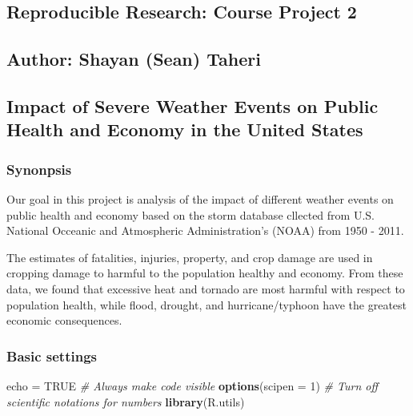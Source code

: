 \documentclass[]{article}
\title{}
\author{}
\date{}
\newenvironment{Shaded}{\begin{snugshade}}{\end{snugshade}}
\newcommand{\KeywordTok}[1]{\textcolor[rgb]{0.13,0.29,0.53}{\textbf{#1}}}
\newcommand{\DataTypeTok}[1]{\textcolor[rgb]{0.13,0.29,0.53}{#1}}
\newcommand{\DecValTok}[1]{\textcolor[rgb]{0.00,0.00,0.81}{#1}}
\newcommand{\StringTok}[1]{\textcolor[rgb]{0.31,0.60,0.02}{#1}}
\newcommand{\CommentTok}[1]{\textcolor[rgb]{0.56,0.35,0.01}{\textit{#1}}}
\newcommand{\OtherTok}[1]{\textcolor[rgb]{0.56,0.35,0.01}{#1}}
\newcommand{\NormalTok}[1]{#1}
\begin{document}
\subsection{Reproducible Research: Course Project
2}\label{reproducible-research-course-project-2}

\subsection{Author: Shayan (Sean)
Taheri}\label{author-shayan-sean-taheri}

\subsection{Impact of Severe Weather Events on Public Health and Economy
in the United
States}\label{impact-of-severe-weather-events-on-public-health-and-economy-in-the-united-states}

\subsubsection{Synonpsis}\label{synonpsis}

Our goal in this project is analysis of the impact of different weather
events on public health and economy based on the storm database cllected
from U.S. National Occeanic and Atmospheric Administration's (NOAA) from
1950 - 2011.

The estimates of fatalities, injuries, property, and crop damage are
used in cropping damage to harmful to the population healthy and
economy. From these data, we found that excessive heat and tornado are
most harmful with respect to population health, while flood, drought,
and hurricane/typhoon have the greatest economic consequences.

\subsubsection{Basic settings}\label{basic-settings}

\begin{Shaded}
\begin{Highlighting}[]
\NormalTok{echo =}\StringTok{ }\OtherTok{TRUE}  \CommentTok{# Always make code visible}
\KeywordTok{options}\NormalTok{(}\DataTypeTok{scipen =} \DecValTok{1}\NormalTok{)  }\CommentTok{# Turn off scientific notations for numbers}
\KeywordTok{library}\NormalTok{(R.utils)}
\end{Highlighting}
\end{Shaded}
\end{document}
